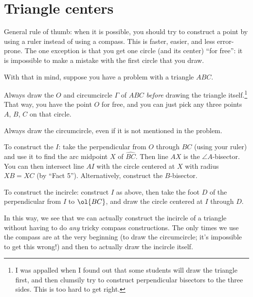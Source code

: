 \documentclass[11pt]{scrartcl}
\begin{document}
\section{Triangle centers}
General rule of thumb: when it is possible,
you should try to construct a point by using a ruler
instead of using a compass.
This is faster, easier, and less error-prone.
The one exception is that you get one circle (and its center) ``for free'':
it is impossible to make a mistake with the first circle that you draw.

With that in mind, suppose you have a problem with a triangle $ABC$.
\begin{itemize}
  \ii Always draw the  $O$ and circumcircle $\Gamma$ of $ABC$
  \emph{before} drawing the triangle itself.\footnote{I
    was appalled when I found out that some students will
    draw the triangle first, and then clumsily try to construct
      perpendicular bisectors to the three sides.
  This is too hard to get right.}
  That way, you have the point $O$ for free,
  and you can just pick any three points $A$, $B$, $C$ on that circle.

  \ii Always draw the circumcircle, even if it is not mentioned in the problem.

  \ii To construct the  $I$:
  take the perpendicular from $O$ through $BC$
  (using your ruler) and use it to find the
  arc midpoint $X$ of $\widehat{BC}$.
  Then line $AX$ is the $\angle A$-bisector.
  You can then intersect line $AI$ with the circle
  centered at $X$ with radius $XB=XC$ (by ``Fact 5'').
  Alternatively, construct the $B$-bisector.

  \ii To construct the incircle: construct $I$ as above,
  then take the foot $D$ of the perpendicular from $I$ to $\ol{BC}$,
  and draw the circle centered at $I$ through $D$.
\end{itemize}

In this way, we see that we can actually construct the incircle of a triangle
without having to do \emph{any} tricky compass constructions.
The only times we use the compass are at the very beginning
(to draw the circumcircle; it's impossible to get this wrong!)
and then to actually draw the incircle itself.
\end{document}
